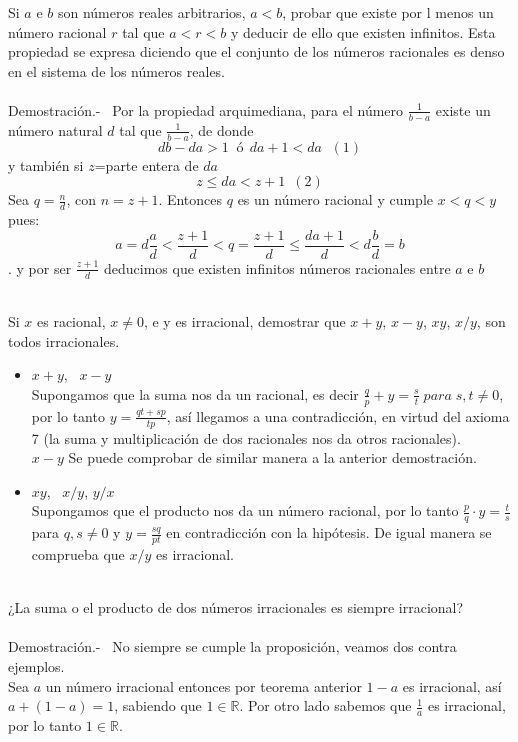 \begin{teo}
Si $a$ e $b$ son números reales arbitrarios, $a<b$, probar que existe por l menos un número racional $r$ tal que $a<r<b$ y deducir de ello que existen infinitos. Esta propiedad se expresa diciendo que el conjunto de los números racionales es denso en el sistema de los números reales.\\\\
Demostración.- \, Por la propiedad arquimediana, para el número $\displaystyle\frac{1}{b-a}$ existe un número natural $d$ tal que $\displaystyle\frac{1}{b-a}$, de donde 
$$db-da>1 \; \; ó \; \, da+1<da \; \, \, (1)$$
y también si $z$=parte entera de $da$
$$z\leq da < z+1 \, \, \, (2)$$
Sea $q=\displaystyle\frac{n}{d}$, con $n=z+1$. Entonces $q$ es un número racional y cumple $x<q<y$ pues:
$$a= d\displaystyle\frac{a}{d} < \frac{z+1}{d}<q=\frac{z+1}{d}\leq \frac{da+1}{d}<d\frac{b}{d}=b$$. y por ser $\displaystyle\frac{z+1}{d}$ deducimos que existen infinitos números racionales entre $a$ e $b$\\\\
\end{teo}

\begin{teo}
Si $x$ es racional, $x\neq 0$, e y es irracional, demostrar que $x+y$, $x-y$, $xy$, $x/y$, son todos irracionales.
\begin{itemize}
\item $x+y$, \, $x-y$\\
Supongamos que la suma nos da un racional, es decir $\displaystyle\frac{q}{p}+y=\frac{s}{t}\; para \; s,t\neq 0$, por lo tanto $y = \displaystyle\frac{qt+sp}{tp}$, así llegamos a una contradicción, en virtud del axioma 7 (la suma y multiplicación de dos racionales nos da otros racionales).\\
$x-y$ Se puede comprobar de similar manera a la anterior demostración.\\
\item $xy$, \, $x/y$, \; $y/x$\\
Supongamos que el producto nos da un número racional, por lo tanto $\frac{p}{q}\cdot y = \displaystyle\frac{t}{s}$ para $q,s \neq 0$ y $ \displaystyle y = \frac{sq}{pt}$ en contradicción con la hipótesis. De igual manera se comprueba que $x/y$ es irracional.\\\\
\end{itemize}
\end{teo}

\begin{teo}
¿La suma o el producto de dos números irracionales es siempre irracional?\\\\
Demostración.- \, No siempre se cumple la proposición, veamos dos contra ejemplos.\\
Sea $a$ un número irracional entonces por teorema anterior $1-a$ es irracional, así $a+(1-a)=1$, sabiendo que $1\in \mathbb{R}$. Por otro lado sabemos que $\displaystyle\frac{1}{a}$ es irracional, por lo tanto $1\in \mathbb{R}$.\\\\
\end{teo}	

